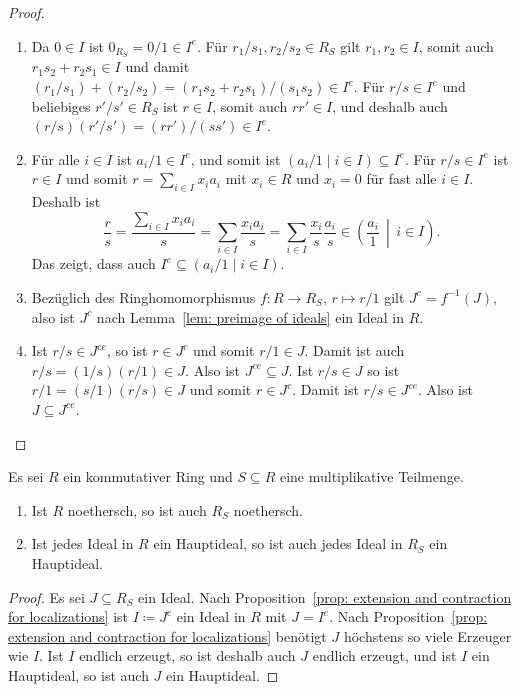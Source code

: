 \documentclass[a4paper,10pt]{scrartcl}
\begin{document}
\begin{proof}
  \begin{enumerate}
    \item
      Da $0 \in I$ ist $0_{R_S} = 0/1 \in I^e$.
      Für $r_1/s_1, r_2/s_2 \in R_S$ gilt $r_1, r_2 \in I$, somit auch $r_1 s_2 + r_2 s_1 \in I$ und damit $(r_1/s_1) + (r_2/s_2) = (r_1 s_2 + r_2 s_1)/(s_1 s_2) \in I^e$.
      Für $r/s \in I^e$ und beliebiges $r'/s' \in R_S$ ist $r \in I$, somit auch $r r' \in I$, und deshalb auch $(r/s)(r'/s') = (r r')/(s s') \in I^e$.
    \item
      Für alle $i \in I$ ist $a_i/1 \in I^e$, und somit ist $(a_i/1 \mid i \in I) \subseteq I^e$.
      Für $r/s \in I^e$ ist $r \in I$ und somit $r = \sum_{i \in I} x_i a_i$ mit $x_i \in R$ und $x_i = 0$ für fast alle $i \in I$.
      Deshalb ist
      \[
            \frac{r}{s}
        =   \frac{\sum_{i \in I} x_i a_i}{s}
        =   \sum_{i \in I} \frac{x_i a_i}{s}
        =   \sum_{i \in I} \frac{x_i}{s} \frac{a_i}{s}
        \in \left( \frac{a_i}{1} \,\middle|\, i \in I \right).
      \]
      Das zeigt, dass auch $I^e \subseteq (a_i/1 \mid i \in I)$.
    \item
      Bezüglich des Ringhomomorphismus $f \colon R \to R_S$, $r \mapsto r/1$ gilt $J^c = f^{-1}(J)$, also ist $J^c$ nach Lemma~\ref{lem: preimage of ideals} ein Ideal in $R$.
    \item
      Ist $r/s \in J^{ce}$, so ist $r \in J^c$ und somit $r/1 \in J$.
      Damit ist auch $r/s = (1/s)(r/1) \in J$.
      Also ist $J^{ce} \subseteq J$.
      Ist $r/s \in J$ so ist $r/1 = (s/1)(r/s) \in J$ und somit $r \in J^c$.
      Damit ist $r/s \in J^{ce}$.
      Also ist $J \subseteq J^{ce}$.
  \end{enumerate}
\end{proof}


\begin{corollary}
  Es sei $R$ ein kommutativer Ring und $S \subseteq R$ eine multiplikative Teilmenge.
  \begin{enumerate}
    \item
      Ist $R$ noethersch, so ist auch $R_S$ noethersch.
    \item
      Ist jedes Ideal in $R$ ein Hauptideal, so ist auch jedes Ideal in $R_S$ ein Hauptideal.
  \end{enumerate}
\end{corollary}


\begin{proof}
  Es sei $J \subseteq R_S$ ein Ideal.
  Nach Proposition~\ref{prop: extension and contraction for localizations} ist $I \coloneqq J^c$ ein Ideal in $R$ mit $J = I^e$.
  Nach Proposition~\ref{prop: extension and contraction for localizations} benötigt $J$ höchstens so viele Erzeuger wie $I$.
  Ist $I$ endlich erzeugt, so ist deshalb auch $J$ endlich erzeugt, und ist $I$ ein Hauptideal, so ist auch $J$ ein Hauptideal.
\end{proof}
\end{document}
